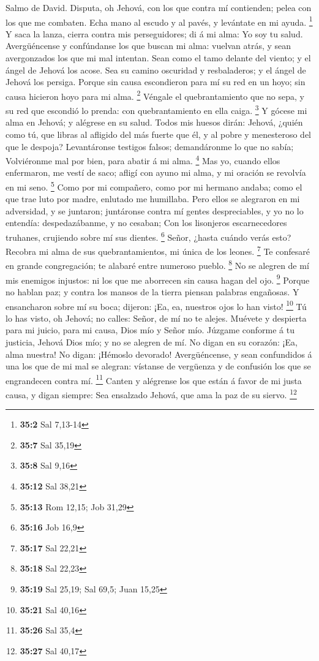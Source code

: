  Salmo de David. Disputa, oh Jehová, con los que contra mí
contienden; pelea con los que me combaten.  Echa mano al
escudo y al pavés, y levántate en mi ayuda. \footnote{\textbf{35:2} Sal
  7,13-14}  Y saca la lanza, cierra contra mis
perseguidores; di á mi alma: Yo soy tu salud.  Avergüéncense
y confúndanse los que buscan mi alma: vuelvan atrás, y sean avergonzados
los que mi mal intentan.  Sean como el tamo delante del
viento; y el ángel de Jehová los acose.  Sea su camino
oscuridad y resbaladeros; y el ángel de Jehová los persiga. 
Porque sin causa escondieron para mí su red en un hoyo; sin causa
hicieron hoyo para mi alma. \footnote{\textbf{35:7} Sal 35,19}
 Véngale el quebrantamiento que no sepa, y su red que
escondió lo prenda: con quebrantamiento en ella caiga. \footnote{\textbf{35:8}
  Sal 9,16}  Y gócese mi alma en Jehová; y alégrese en su
salud.  Todos mis huesos dirán: Jehová, ¿quién como tú, que
libras al afligido del más fuerte que él, y al pobre y menesteroso del
que le despoja?  Levantáronse testigos falsos; demandáronme
lo que no sabía;  Volviéronme mal por bien, para abatir á
mi alma. \footnote{\textbf{35:12} Sal 38,21}  Mas yo,
cuando ellos enfermaron, me vestí de saco; afligí con ayuno mi alma, y
mi oración se revolvía en mi seno. \footnote{\textbf{35:13} Rom 12,15;
  Job 31,29}  Como por mi compañero, como por mi hermano
andaba; como el que trae luto por madre, enlutado me humillaba.
 Pero ellos se alegraron en mi adversidad, y se juntaron;
juntáronse contra mí gentes despreciables, y yo no lo entendía:
despedazábanme, y no cesaban;  Con los lisonjeros
escarnecedores truhanes, crujiendo sobre mí sus dientes. \footnote{\textbf{35:16}
  Job 16,9}  Señor, ¿hasta cuándo verás esto? Recobra mi
alma de sus quebrantamientos, mi única de los leones. \footnote{\textbf{35:17}
  Sal 22,21}  Te confesaré en grande congregación; te
alabaré entre numeroso pueblo. \footnote{\textbf{35:18} Sal 22,23}
 No se alegren de mí mis enemigos injustos: ni los que me
aborrecen sin causa hagan del ojo. \footnote{\textbf{35:19} Sal 25,19;
  Sal 69,5; Juan 15,25}  Porque no hablan paz; y contra los
mansos de la tierra piensan palabras engañosas.  Y
ensancharon sobre mí su boca; dijeron: ¡Ea, ea, nuestros ojos lo han
visto! \footnote{\textbf{35:21} Sal 40,16}  Tú lo has
visto, oh Jehová; no calles: Señor, de mí no te alejes. 
Muévete y despierta para mi juicio, para mi causa, Dios mío y Señor mío.
 Júzgame conforme á tu justicia, Jehová Dios mío; y no se
alegren de mí.  No digan en su corazón: ¡Ea, alma nuestra!
No digan: ¡Hémoslo devorado!  Avergüéncense, y sean
confundidos á una los que de mi mal se alegran: vístanse de vergüenza y
de confusión los que se engrandecen contra mí. \footnote{\textbf{35:26}
  Sal 35,4}  Canten y alégrense los que están á favor de mi
justa causa, y digan siempre: Sea ensalzado Jehová, que ama la paz de su
siervo. \footnote{\textbf{35:27} Sal 40,17}

